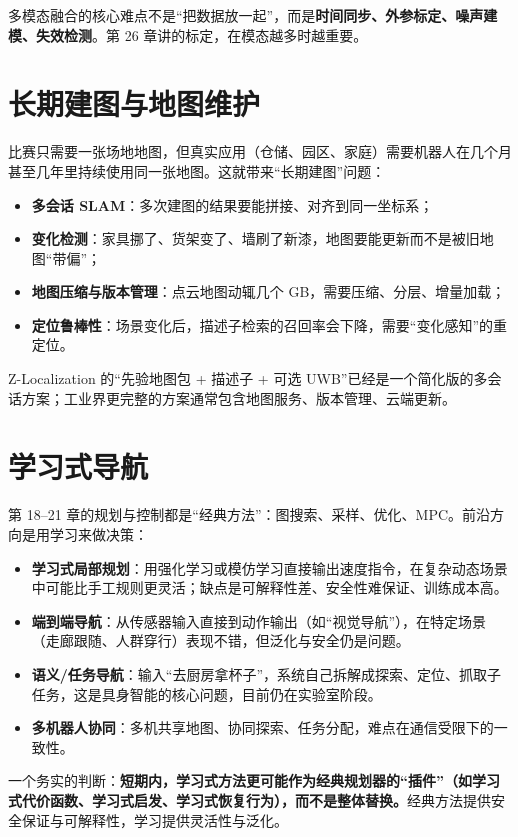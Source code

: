 多模态融合的核心难点不是“把数据放一起”，而是\textbf{时间同步、外参标定、噪声建模、失效检测}。第 26 章讲的标定，在模态越多时越重要。

\section{长期建图与地图维护}\label{sec:24-lifelong}

比赛只需要一张场地地图，但真实应用（仓储、园区、家庭）需要机器人在几个月甚至几年里持续使用同一张地图。这就带来“长期建图”问题：
\begin{itemize}
  \item \textbf{多会话 SLAM}：多次建图的结果要能拼接、对齐到同一坐标系；
  \item \textbf{变化检测}：家具挪了、货架变了、墙刷了新漆，地图要能更新而不是被旧地图“带偏”；
  \item \textbf{地图压缩与版本管理}：点云地图动辄几个 GB，需要压缩、分层、增量加载；
  \item \textbf{定位鲁棒性}：场景变化后，描述子检索的召回率会下降，需要“变化感知”的重定位。
\end{itemize}
Z-Localization 的“先验地图包 + 描述子 + 可选 UWB”已经是一个简化版的多会话方案；工业界更完整的方案通常包含地图服务、版本管理、云端更新。

\section{学习式导航}\label{sec:24-learnnav}

第 18--21 章的规划与控制都是“经典方法”：图搜索、采样、优化、MPC。前沿方向是用学习来做决策：
\begin{itemize}
  \item \textbf{学习式局部规划}：用强化学习或模仿学习直接输出速度指令，在复杂动态场景中可能比手工规则更灵活；缺点是可解释性差、安全性难保证、训练成本高。
  \item \textbf{端到端导航}：从传感器输入直接到动作输出（如“视觉导航”），在特定场景（走廊跟随、人群穿行）表现不错，但泛化与安全仍是问题。
  \item \textbf{语义/任务导航}：输入“去厨房拿杯子”，系统自己拆解成探索、定位、抓取子任务，这是具身智能的核心问题，目前仍在实验室阶段。
  \item \textbf{多机器人协同}：多机共享地图、协同探索、任务分配，难点在通信受限下的一致性。
\end{itemize}

一个务实的判断：\textbf{短期内，学习式方法更可能作为经典规划器的“插件”（如学习式代价函数、学习式启发、学习式恢复行为），而不是整体替换。}经典方法提供安全保证与可解释性，学习提供灵活性与泛化。

